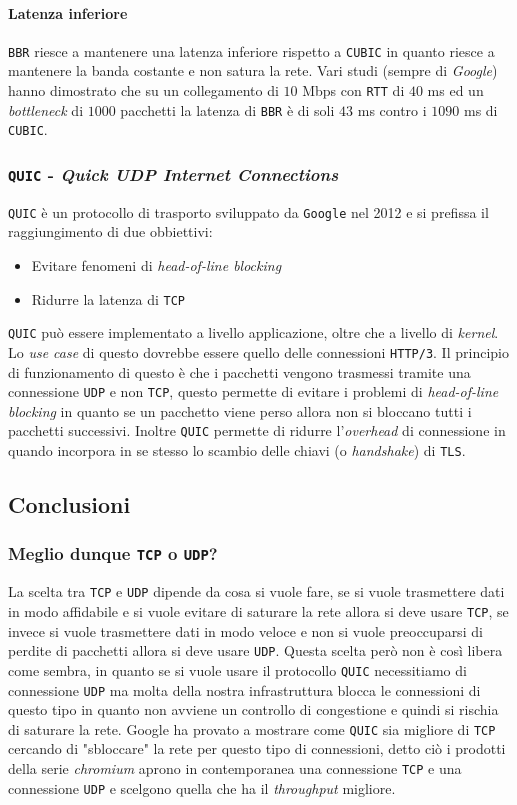             \paragraph{Latenza inferiore} \texttt{BBR} riesce a mantenere una latenza inferiore rispetto a \texttt{CUBIC} in quanto riesce a mantenere la banda costante e non satura la rete. Vari studi (sempre di \textit{Google}) hanno dimostrato che su un collegamento di $10$ Mbps con \texttt{RTT} di $40$ ms ed un \textit{bottleneck} di $1000$ pacchetti la latenza di \texttt{BBR} è di soli $43$ ms contro i $1090$ ms di \texttt{CUBIC}.
        \subsubsection{\texttt{QUIC} - \textit{Quick UDP Internet Connections}}
            \texttt{QUIC} è un protocollo di trasporto sviluppato da \texttt{Google} nel 2012 e si prefissa il raggiungimento di due obbiettivi:\begin{itemize}
                \item Evitare fenomeni di \textit{head-of-line blocking}
                \item Ridurre la latenza di \texttt{TCP}
            \end{itemize}
            \texttt{QUIC} può essere implementato a livello applicazione, oltre che a livello di \textit{kernel}. Lo \textit{use case} di questo dovrebbe essere quello delle connessioni \texttt{HTTP/3}. Il principio di funzionamento di questo è che i pacchetti vengono trasmessi tramite una connessione \texttt{UDP} e non \texttt{TCP}, questo permette di evitare i problemi di \textit{head-of-line blocking} in quanto se un pacchetto viene perso allora non si bloccano tutti i pacchetti successivi. Inoltre \texttt{QUIC} permette di ridurre l'\textit{overhead} di connessione in quando incorpora in se stesso lo scambio delle chiavi (o \textit{handshake}) di \texttt{TLS}.
    \subsection{Conclusioni}
        \subsubsection{Meglio dunque \texttt{TCP} o \texttt{UDP}?}
        La scelta tra \texttt{TCP} e \texttt{UDP} dipende da cosa si vuole fare, se si vuole trasmettere dati in modo affidabile e si vuole evitare di saturare la rete allora si deve usare \texttt{TCP}, se invece si vuole trasmettere dati in modo veloce e non si vuole preoccuparsi di perdite di pacchetti allora si deve usare \texttt{UDP}. Questa scelta però non è così libera come sembra, in quanto se si vuole usare il protocollo \texttt{QUIC} necessitiamo di connessione \texttt{UDP} ma molta della nostra infrastruttura blocca le connessioni di questo tipo in quanto non avviene un controllo di congestione e quindi si rischia di saturare la rete. Google ha provato a mostrare come \texttt{QUIC} sia migliore di \texttt{TCP} cercando di "sbloccare" la rete per questo tipo di connessioni, detto ciò i prodotti della serie \textit{chromium} aprono in contemporanea una connessione \texttt{TCP} e una connessione \texttt{UDP} e scelgono quella che ha il \textit{throughput} migliore. 
